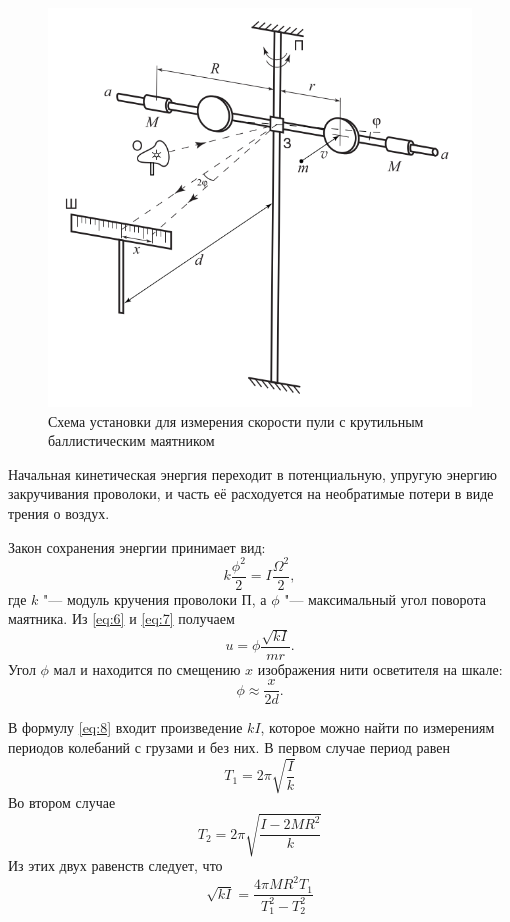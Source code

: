             \begin{figure}
                \centering
                \includegraphics[width=0.75\linewidth]{setting-2.png}
                \caption{Схема установки для измерения скорости пули с крутильным баллистическим маятником}
                \label{fig:setting-2}
            \end{figure}

            Начальная кинетическая энергия переходит в потенциальную, упругую энергию закручивания проволоки, и часть её расходуется на необратимые потери в виде трения о воздух.

            Закон сохранения энергии принимает вид:
            \begin{equation}
                k \frac{\phi^2}{2} = I \frac{\Omega^2}{2},
                \label{eq:7}
            \end{equation}
            где $k$ "--- модуль кручения проволоки П, а $\phi$ "--- максимальный угол поворота маятника.
            Из \ref{eq:6} и \ref{eq:7} получаем
            \begin{equation}
                u = \phi \frac{\sqrt{kI}}{mr}.
                \label{eq:8}
            \end{equation}
            Угол $\phi$ мал и находится по смещению $x$ изображения нити осветителя на шкале:
            \begin{equation}
                \phi \approx  \frac{x}{2d}.
                \label{eq:9}
            \end{equation}

            В формулу \ref{eq:8} входит произведение $kI$, которое можно найти по измерениям периодов колебаний с грузами и без них. В первом случае период равен
            \begin{equation}
                T_1 = 2\pi \sqrt{\frac{I}{k}}
            \end{equation}
            Во втором случае
            \begin{equation}
                T_2 = 2\pi \sqrt{\frac{I-2MR^2}{k}}
            \end{equation}
            Из этих двух равенств следует, что
            \begin{equation}
                \sqrt{kI} = \frac{4\pi MR^2 T_1}{T_1^2 - T_2^2}
                \label{eq:connection}
            \end{equation}

